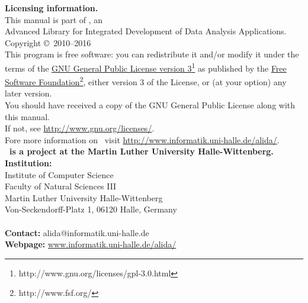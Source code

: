 \newpage
\thispagestyle{empty}
\parindent0pt
{\large \textbf{Licensing information.}}\\[0.5cm]
This manual is part of \alida, an\\
Advanced Library for Integrated Development of Data Analysis
Applications.\\[0.5cm] Copyright \copyright\ 2010--2016\\[0.5cm] 
This program is free software: you can redistribute it and/or modify
it under the terms of the
\href{http://www.gnu.org/licenses/gpl-3.0.html}
{GNU General Public License version	3}\footnote{http://www.gnu.org/licenses/gpl-3.0.html} as published by the \href{http://www.fsf.org/}{Free Software Foundation}\footnote{http://www.fsf.org/}, either version 3 of the License, or (at your option) any later version.\\
You should have received a copy of the GNU General Public License
along with this manual.\\
If not,
see \url{http://www.gnu.org/licenses/}.\\[1.0cm]
Fore more information on \alida\ visit
\href{http://www.informatik.uni-halle.de/alida/}{
http://www.informatik.uni-halle.de/alida/}.\\[5.0cm] 

{\large \textbf{\alida\ is a project at the Martin Luther University
Halle-Wittenberg.}}\\[0.5cm]

\textbf{Institution:}\\[0.5cm]
Institute of Computer Science\\
Faculty of Natural Sciences III\\
Martin Luther University Halle-Wittenberg\\
Von-Seckendorff-Platz 1, 06120 Halle, Germany\\\\
\textbf{Contact:} alida@informatik.uni-halle.de\\
\textbf{Webpage:} \url{www.informatik.uni-halle.de/alida/}
\parindent20pt
\newpage
{}


\tableofcontents

\setcounter{page}{1}
\clearpage
{}

